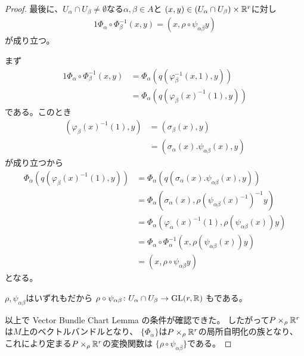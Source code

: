 \documentclass[report]{jlreq}
\begin{document}
\begin{proof}
    最後に、$U_\alpha \cap U_\beta \neq \emptyset$なる$\alpha, \beta \in A$と
    $(x, y) \in (U_\alpha \cap U_\beta) \times \mathbb{R}^r$に対し
    \begin{alignat}{1}
        \Phi_\alpha \circ \Phi_\beta^{-1} (x, y)
            = (x, \rho \circ \psi_{\alpha\beta} y)
    \end{alignat}
    が成り立つ。
    \begin{innerproof}
        まず
        \begin{alignat}{1}
            \Phi_\alpha \circ \Phi_\beta^{-1} (x, y)
                &= \Phi_\alpha(q(\varphi_\beta^{-1}(x, 1), y)) \\
                &= \Phi_\alpha(q(\varphi_\beta(x)^{-1}(1), y))
        \end{alignat}
        である。このとき
        \begin{align}
            (\varphi_\beta(x)^{-1}(1), y)
            &= (\sigma_\beta(x), y) \\
            &= (\sigma_\alpha(x) . \psi_{\alpha\beta}(x), y)
        \end{align}
        が成り立つから
        \begin{align}
            \Phi_\alpha(q(\varphi_\beta(x)^{-1}(1), y))
                &= \Phi_\alpha(q(\sigma_\alpha(x) . \psi_{\alpha\beta}(x), y)) \\
                &= \Phi_\alpha(
                    \sigma_\alpha(x),
                    \rho(\psi_{\alpha\beta}(x)^{-1})^{-1} y
                ) \\
                &= \Phi_\alpha(
                    \varphi_\alpha(x)^{-1}(1),
                    \rho(\psi_{\alpha\beta}(x)) y
                ) \\
                &= \Phi_\alpha \circ \Phi_\alpha^{-1}(
                    x,
                    \rho(\psi_{\alpha\beta}(x)) y
                ) \\
                &= (x, \rho \circ \psi_{\alpha\beta} y)
        \end{align}
        となる。
    \end{innerproof}
    $\rho, \psi_{\alpha\beta}$はいずれも{\smooth}だから
    $\rho \circ \psi_{\alpha\beta} \colon U_\alpha \cap U_\beta \to \operatorname{\mathrm{GL}}(r, \mathbb{R})$
    も{\smooth}である。

    以上で Vector Bundle Chart Lemma の条件が確認できた。
    したがって$P \times_\rho \mathbb{R}^r$は$M$上のベクトルバンドルとなり、
    $\{ \Phi_\alpha \}$は$P \times_\rho \mathbb{R}^r$の局所自明化の族となり、
    これにより定まる$P \times_\rho \mathbb{R}^r$の変換関数は
    $\{ \rho \circ \psi_{\alpha\beta} \}$である。
\end{proof}
\end{document}
